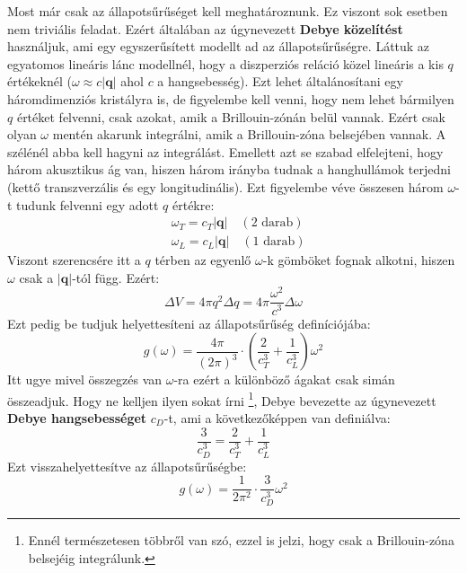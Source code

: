 \documentclass[../main.tex]{subfiles}
\begin{document}
Most már csak az állapotsűrűséget kell meghatároznunk. Ez viszont sok esetben nem triviális feladat. Ezért általában az úgynevezett \textbf{Debye közelítést} használjuk, ami egy egyszerűsített modellt ad az állapotsűrűségre.
Láttuk az egyatomos lineáris lánc modellnél, hogy a diszperziós reláció közel lineáris a kis $q$ értékeknél ($\omega \approx c |\mathbf{q}|$ ahol $c$ a hangsebesség). 
Ezt lehet általánosítani egy háromdimenziós kristályra is, de figyelembe kell venni, hogy nem lehet bármilyen $q$ értéket felvenni, csak azokat, amik a Brillouin-zónán belül vannak. Ezért csak olyan $\omega$ mentén akarunk integrálni, amik a Brillouin-zóna belsejében vannak.
A szélénél abba kell hagyni az integrálást. Emellett azt se szabad elfelejteni, hogy három akusztikus ág van, hiszen három irányba tudnak a hanghullámok terjedni (kettő transzverzális és egy longitudinális). Ezt figyelembe véve összesen három $\omega$-t tudunk felvenni egy adott $q$ értékre:
\begin{equation}
    \begin{aligned}
        &\omega_T = c_T |\mathbf{q}| \quad (2 \text{ darab}) \\
        &\omega_L = c_L |\mathbf{q}| \quad (1 \text{ darab})
    \end{aligned}
\end{equation}
Viszont szerencsére itt a $q$ térben az egyenlő $\omega$-k gömböket fognak alkotni, hiszen $\omega$ csak a $|\mathbf{q}|$-tól függ. Ezért:
\begin{equation}
    \Delta V = 4 \pi q^2 \Delta q = 4 \pi \frac{\omega^2}{c^3} \Delta \omega
\end{equation}
Ezt pedig be tudjuk helyettesíteni az állapotsűrűség definíciójába:
\begin{equation}
    g(\omega) = \frac{4 \pi}{(2 \pi)^3} \cdot \left(\frac{2}{c_T^3} + \frac{1}{c_L^3}\right) \omega^2
\end{equation}
Itt ugye mivel összegzés van $\omega$-ra ezért a különböző ágakat csak simán összeadjuk. Hogy ne kelljen ilyen sokat írni
\footnote{
    Ennél természetesen többről van szó, ezzel is jelzi, hogy csak a Brillouin-zóna belsejéig integrálunk.
}, Debye bevezette az úgynevezett \textbf{Debye hangsebességet} $c_D$-t, ami a következőképpen van definiálva:
\begin{equation}
    \frac{3}{c_D^3} = \frac{2}{c_T^3} + \frac{1}{c_L^3}
\end{equation}
Ezt visszahelyettesítve az állapotsűrűségbe:
\begin{equation}
    \boxed{g(\omega) = \frac{1}{2 \pi^2} \cdot \frac{3}{c_D^3} \omega^2}
\end{equation}
\end{document}
